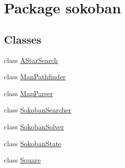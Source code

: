 \hypertarget{namespacesokoban}{
\section{Package sokoban}
\label{namespacesokoban}
}
\subsection*{Classes}
\begin{CompactItemize}
\item 
class \hyperlink{classsokoban_1_1AStarSearch}{AStarSearch}
\item 
class \hyperlink{classsokoban_1_1ManPathfinder}{ManPathfinder}
\item 
class \hyperlink{classsokoban_1_1MapParser}{MapParser}
\item 
class \hyperlink{classsokoban_1_1SokobanSearcher}{SokobanSearcher}
\item 
class \hyperlink{classsokoban_1_1SokobanSolver}{SokobanSolver}
\item 
class \hyperlink{classsokoban_1_1SokobanState}{SokobanState}
\item 
class \hyperlink{classsokoban_1_1Square}{Square}
\end{CompactItemize}
